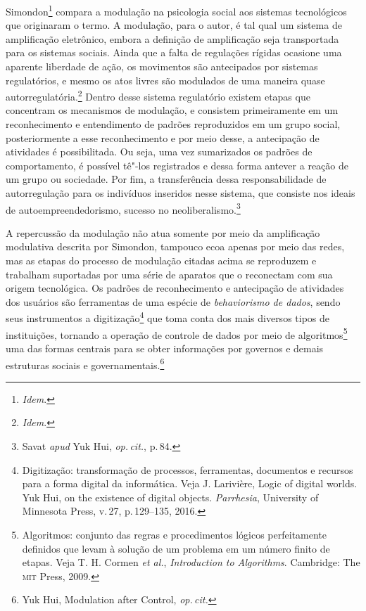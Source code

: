 Simondon\footnote{\textit{Idem}.} compara a modulação na psicologia social
aos sistemas tecnológicos que originaram o termo. A modulação, para o
autor, é tal qual um sistema de amplificação eletrônico, embora a
definição de amplificação seja transportada para os sistemas sociais.
Ainda que a falta de regulações rígidas ocasione uma aparente liberdade
de ação, os movimentos são antecipados por sistemas regulatórios, e
mesmo os atos livres são modulados de uma maneira quase autorregulatória.\footnote{\textit{Idem}.}
Dentro desse sistema regulatório existem etapas que
concentram os mecanismos de modulação, e consistem primeiramente em um
reconhecimento e entendimento de padrões reproduzidos em um grupo
social, posteriormente a esse reconhecimento e por meio desse, a
antecipação de atividades é possibilitada. Ou seja, uma vez sumarizados
os padrões de comportamento, é possível tê"-los registrados e dessa forma
antever a reação de um grupo ou sociedade. Por fim, a transferência
dessa responsabilidade de autorregulação para os indivíduos inseridos
nesse sistema, que consiste nos ideais de autoempreendedorismo, sucesso
no neoliberalismo.\footnote{Savat \textit{apud} Yuk Hui, \textit{op.\,cit.}, p.\,84.}

A repercussão da modulação não atua somente por meio da amplificação
modulativa descrita por Simondon, tampouco ecoa apenas por meio das
redes, mas as etapas do processo de modulação citadas acima se
reproduzem e trabalham suportadas por uma série de aparatos que o
reconectam com sua origem tecnológica. Os padrões de reconhecimento e
antecipação de atividades dos usuários são ferramentas de uma espécie de
\textit{behaviorismo de dados}, sendo seus instrumentos a
digitização\footnote{Digitização: transformação de processos,
  ferramentas, documentos e recursos para a forma digital da informática. Veja J. Larivière, Logic of digital worlds. Yuk Hui, on the
existence of digital objects. \textit{Parrhesia}, University of Minnesota Press, v.\,27, p.\,129--135, 2016.} que toma conta dos mais diversos tipos de
instituições, tornando a operação de controle de dados por meio de
algoritmos\footnote{Algoritmos: conjunto das regras e procedimentos
  lógicos perfeitamente definidos que levam à solução de um problema em
  um número finito de etapas. Veja T. H. Cormen \textit{et al.},
\textit{Introduction to Algorithms}. Cambridge: The \textsc{mit} Press, 2009.} uma das formas centrais para se obter
informações por governos e demais estruturas sociais e governamentais.\footnote{Yuk Hui, Modulation after Control, \textit{op.\,cit.}}

